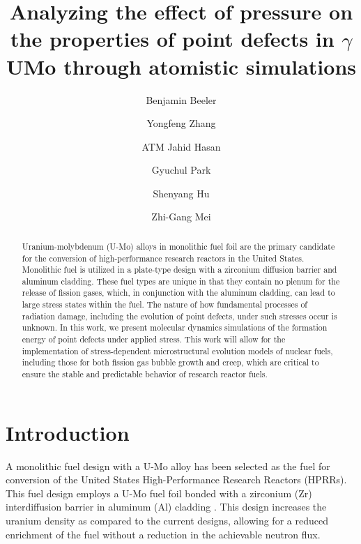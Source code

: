 \documentclass[11pt, oneside]{elsarticle}
\begin{document}
\begin{frontmatter}

\title{Analyzing the effect of pressure on the properties of point defects in $\gamma$UMo through atomistic simulations}

\author[ncsu,inl]{Benjamin Beeler}
\author[wisc]{Yongfeng Zhang}
\author[ncsu]{ATM Jahid Hasan}
\author[purdue]{Gyuchul Park}
\author[pnnl]{Shenyang Hu}
\author[anl]{Zhi-Gang Mei}
\address[ncsu]{North Carolina State University, Raleigh, NC 27695}
\address[inl]{Idaho National Laboratory, Idaho Falls, ID 83415}
\address[wisc]{University of Wisconsin-Madison, Madison, WI 53715}
\address[purdue]{Purdue University, West Lafayette, IN 47907 }
\address[pnnl]{Pacific Northwest National Laboratory, Richland, WA 99354}
\address[anl]{Argonne National Laboratory, Lemont, IL 60439}




\begin{abstract}
Uranium-molybdenum (U-Mo) alloys in monolithic fuel foil are the primary candidate for the conversion of high-performance research reactors in the United States. Monolithic fuel is utilized in a plate-type design with a zirconium diffusion barrier and aluminum cladding. These fuel types are unique in that they contain no plenum for the release of fission gases, which, in conjunction with the aluminum cladding, can lead to large stress states within the fuel. The nature of how fundamental processes of radiation damage, including the evolution of point defects, under such stresses occur is unknown. In this work, we present molecular dynamics simulations of the formation energy of point defects under applied stress. This work will allow for the implementation of stress-dependent microstructural evolution models of nuclear fuels, including those for both fission gas bubble growth and creep, which are critical to ensure the stable and predictable behavior of research reactor fuels. 
\end{abstract}

\end{frontmatter}

\linenumbers
\modulolinenumbers[2]

\section{Introduction}\label{sec1}

A monolithic fuel design with a U-Mo alloy has been selected as the fuel for conversion of the United States High-Performance Research Reactors (HPRRs). This fuel design employs a U-Mo fuel foil bonded with a zirconium (Zr) interdiffusion barrier in aluminum (Al) cladding \cite{meyer2014}. This design increases the uranium density as compared to the current designs, allowing for a reduced enrichment of the fuel without a reduction in the achievable neutron flux. 
\end{document}
